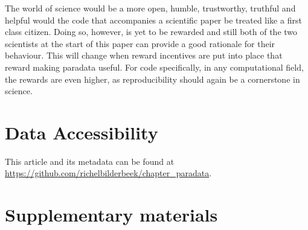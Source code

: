 {%

The world of science would be a more open, humble, trustworthy, truthful
and helpful would the code that accompanies a scientific paper
be treated like a first class citizen. 
Doing so, however, is yet to be rewarded
and still both of the two scientists at the start of this paper 
can provide a good rationale for their behaviour.
This will change when reward incentives are put into place 
that reward making paradata useful.
For code specifically, in any computational field,
the rewards are even higher, as reproducibility should again be 
a cornerstone in science.

\section{Data Accessibility}

This article and its metadata can be found at 
\url{https://github.com/richelbilderbeek/chapter_paradata}.




\iffalse

\newpage
\appendix
\section{Supplementary materials}

\renewcommand{\thefigure}{S\arabic{figure}}
\setcounter{figure}{0}

\renewcommand{\thetable}{S\arabic{table}}
\setcounter{table}{0}

}
